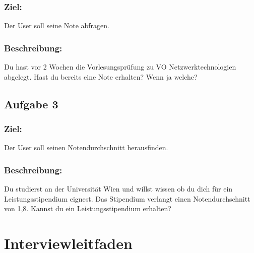 \documentclass[a4paper,10pt]{scrartcl}
\begin{document}
\subsubsection*{Ziel:}

Der User soll seine Note abfragen.

\subsubsection*{Beschreibung:}

Du hast vor 2 Wochen die Vorlesungsprüfung zu VO Netzwerktechnologien abgelegt. Hast du bereits eine Note erhalten? Wenn ja welche?

\subsection{Aufgabe 3}

\noindent{}
\medskip

\subsubsection*{Ziel:}

Der User soll seinen Notendurchschnitt herausfinden.

\subsubsection*{Beschreibung:}

Du studierst an der Universität Wien und willst wissen ob du dich für ein Leistungsstipendium eignest. Das Stipendium verlangt einen Notendurchschnitt von
1,8. Kannst du ein Leistungsstipendium erhalten?

\section{Interviewleitfaden}
\end{document}
